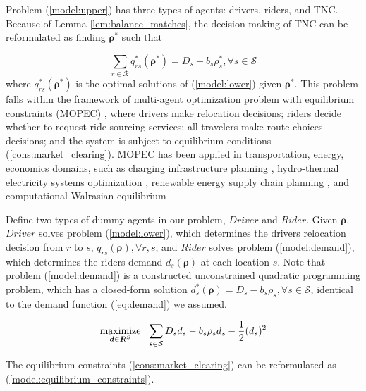 \documentclass[review]{elsarticle}
\begin{document}
%

Problem (\ref{model:upper}) has three types of agents: drivers, riders, and TNC. Because of Lemma \ref{lem:balance_matches}, the decision making of TNC can be reformulated as finding $\bm{\rho}^*$ such that 

\begin{equation}
\label{cons:market_clearing}
    \sum_{r \in \mathcal{R}} q_{rs}^{\ast}(\bm{\rho}^*) = D_s - b_s\rho_{s}^{\ast}, \forall s \in \mathcal{S}
\end{equation}
where $q_{rs}^{\ast}(\bm{\rho}^*)$ is the optimal solutions of (\ref{model:lower}) given $\bm{\rho}^*$. This problem falls within the framework of multi-agent optimization problem with equilibrium constraints (MOPEC) \citep{ferris2013mopec}, where drivers make relocation decisions; riders decide whether to request ride-sourcing services; all travelers make route choices decisions; and the system is subject to equilibrium conditions (\ref{cons:market_clearing}). MOPEC has been applied in transportation, energy, economics domains, such as charging infrastructure planning \citep{Guo_et_al_16}, hydro-thermal electricity systems optimization \citep{philpott2016equilibrium}, renewable energy supply chain planning \citep{guo2017stochastic}, and computational Walrasian equilibrium \citep{deride2019solving}.

Define two types of dummy agents in our problem, $Driver$ and $Rider$. Given $\bm{\rho}$, $Driver$ solves problem (\ref{model:lower}), which determines the drivers relocation decision from $r$ to $s$, $q_{rs}(\bm{\rho}), \forall r, s$; and $Rider$ solves problem (\ref{model:demand}), which determines the riders demand $d_s(\bm{\rho})$ at each location $s$. Note that problem (\ref{model:demand}) is a constructed unconstrained quadratic programming problem, which has a closed-form solution $d_s^{\ast}(\bm{\rho}) = D_s - b_s \rho_s, \forall s \in \mathcal{S}$, identical to the demand function (\ref{eq:demand}) we assumed.  

\begin{equation}
\label{model:demand}
\underset{\bm{d} \in {I\kern-.35em R}^{S}}{\text{maximize}} \ \ \sum_{s \in \mathcal{S}} D_s d_s - b_s\rho_s d_s - \frac{1}{2}(d_s)^2
\end{equation}

The equilibrium constraints (\ref{cons:market_clearing}) can be reformulated as (\ref{model:equilibrium_constraints}). 
\end{document}
